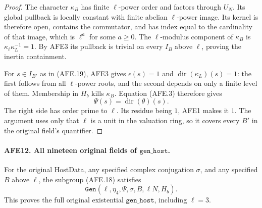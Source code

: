 \begin{proof}
The character \(\kappa_B\) has finite \(\ell\)-power
order and factors through \(U_N\).
Its global pullback is locally constant with finite
abelian \(\ell\)-power image.
Its kernel is therefore open, contains the commutator,
and has index equal to the cardinality of that image,
which is \(\ell^a\) for some \(a\ge0\).
The \(\ell\)-modulus component of \(\kappa_B\) is
\(\kappa_\ell\kappa_L^{-1}=1\).
By AFE3 its pullback is trivial on every \(I_B\)
above \(\ell\), proving the inertia containment.

For \(s\in I_{B'}\) as in (AFE.19), AFE3 gives
\(\epsilon(s)=1\) and
\(\operatorname{dir}(\kappa_L)(s)=1\):
the first follows from all \(\ell\)-power roots,
and the second depends on only a finite level of them.
Membership in \(H_b\) kills \(\kappa_B\).
Equation (AFE.3) therefore gives
\[
                         \Psi(s)=\operatorname{dir}(\theta)(s).
 \]
The right side has order prime to \(\ell\).
Its residue being \(1\), AFE1 makes it \(1\).
The argument uses only that \(\ell\) is a unit in
the valuation ring, so it covers every \(B'\) in
the original field's quantifier.
\end{proof}

\paragraph{AFE12. All nineteen original fields of \(\texttt{gen\_host}\).}
\label{claim:AFE12}
For the original HostData, any specified complex
conjugation \(\sigma\), and any specified \(B\) above
\(\ell\), the subgroup (AFE.18) satisfies
\[
        \texttt{Gen}(\ell,\eta_4,\Psi,\sigma,B,\ell N,H_b).
                                                        \tag{AFE.20}
\]
This proves the full original existential
\(\texttt{gen\_host}\), including \(\ell=3\).

